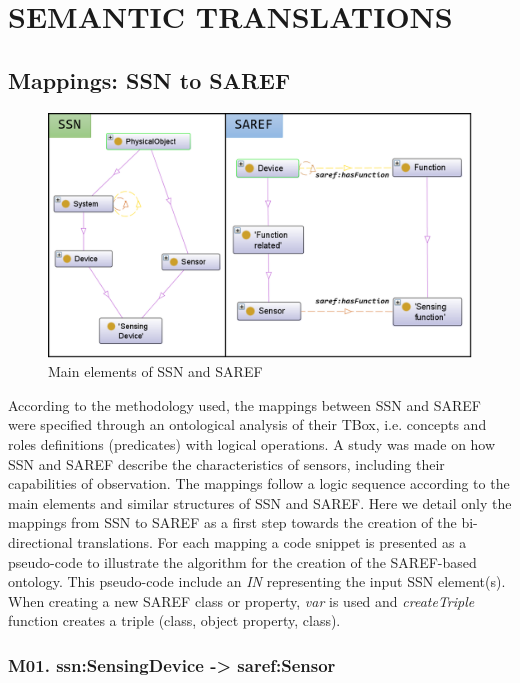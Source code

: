 \documentclass{sig-alternate-05-2015}
\begin{document}

\section{SEMANTIC TRANSLATIONS}

\subsection{Mappings: SSN to SAREF}

\begin{figure}[h!]
\centering
\includegraphics[scale=0.28]{SSN_SAREF_SensingDevice_Device}
\caption{Main elements of SSN and SAREF}
\label{fig:SSN_SAREF_SensingDevice_Device}
\end{figure}

According to the methodology used, the mappings between SSN and SAREF were specified through an ontological analysis of their TBox, i.e. concepts and roles definitions (predicates) with logical operations. A study was made on how SSN and SAREF describe the characteristics of sensors, including their capabilities of observation. The mappings follow a logic sequence according to the main elements and similar structures of SSN and SAREF. Here we detail only the mappings from SSN to SAREF as a first step towards the creation of the bi-directional translations. For each mapping a code snippet is presented as a pseudo-code to illustrate the algorithm for the creation of the SAREF-based ontology. This pseudo-code include an \textit{IN} representing the input SSN element(s). When creating a new SAREF class or property, \textit{var} is used and \textit{createTriple} function creates a triple (class, object property, class).

\subsubsection{M01. ssn:\-SensingDevice -> saref:\-Sensor}
\end{document}
